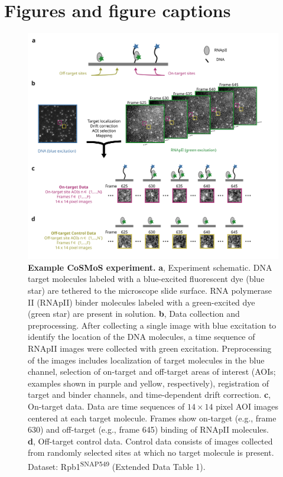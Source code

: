 \clearpage
\newpage
\section*{Figures and figure captions}
\pagebreak

\renewcommand{\figurename}{Fig.}

\begin{figure}[h]
\centering
\includegraphics[width=\textwidth]{figures/figure1/figure1.png}
\caption{\textbf{Example CoSMoS experiment.} \textbf{a}, Experiment schematic. DNA target molecules labeled with a blue-excited fluorescent dye (blue star) are tethered to the microscope slide surface. RNA polymerase II (RNApII) binder molecules labeled with a green-excited dye (green star) are present in solution. \textbf{b}, Data collection and preprocessing. After collecting a single image with blue excitation to identify the location of the DNA molecules, a time sequence of RNApII images were collected with green excitation.  Preprocessing of the images includes localization of target molecules in the blue channel, selection of on-target and off-target areas of interest (AOIs; examples shown in purple and yellow, respectively), registration of target and binder channels, and time-dependent drift correction. \textbf{c}, On-target data. Data are time sequences of $14 \times 14$ pixel AOI images centered at each target molecule. Frames show on-target (e.g., frame 630) and off-target (e.g., frame 645) binding of RNApII molecules. \textbf{d}, Off-target control data. Control data consists of images collected from randomly selected sites at which no target molecule is present. Dataset: Rpb1\textsuperscript{SNAP549} (Extended Data Table 1). }
\label{fig:cosmos_experiment}
\end{figure}

